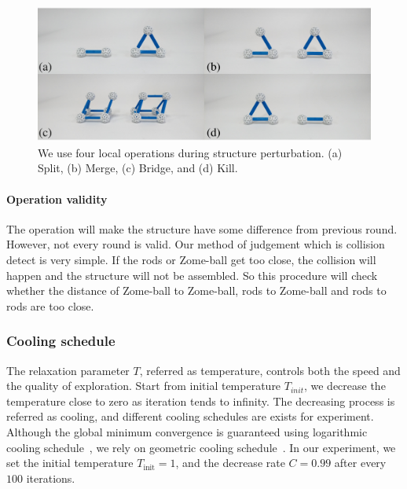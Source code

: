 \begin{figure}[ht]
\centering
\includegraphics[width=1.0\linewidth]{figs/local_opt.pdf} 
\caption{We use four local operations during structure perturbation. (a) Split, (b) Merge, (c) Bridge, and (d) Kill.}
\label{fig:local_op}
\end{figure}

\paragraph{Operation validity}
The operation will make the structure have some difference from previous round. However, not every round is valid. Our method of judgement which is collision detect is very simple. If the rods or Zome-ball get too close, the collision will happen and the structure will not be assembled. So this procedure will check whether the distance of Zome-ball to Zome-ball, rods to Zome-ball and rods to rods are too close.

\subsubsection{Cooling schedule}
The relaxation parameter $T$, referred as temperature, controls both the speed and the quality of exploration.
Start from initial temperature $T_{init}$, we decrease the temperature close to zero as iteration tends to infinity.
The decreasing process is referred as cooling, and different cooling schedules are exists for experiment.
Although the global minimum convergence is guaranteed using logarithmic cooling schedule~\cite{Salamon:2002:SA}, we rely on geometric cooling schedule~\cite{Henderson:2003:SA}. 
In our experiment, we set the initial temperature $T_\text{init} = 1$, and the decrease rate $C=0.99$ after every $100$ iterations.